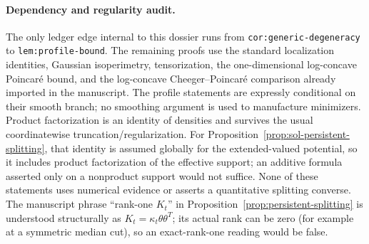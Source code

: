 \documentclass[../main.tex]{subfiles}
\begin{document}
\paragraph{Dependency and regularity audit.}
The only ledger edge internal to this dossier runs from
\texttt{cor:generic-degeneracy} to \texttt{lem:profile-bound}.  The remaining proofs use the
standard localization identities, Gaussian isoperimetry, tensorization, the one-dimensional
log-concave Poincar\'e bound, and the log-concave Cheeger--Poincar\'e comparison already imported
in the manuscript.  The profile statements are expressly conditional on their smooth branch;
no smoothing argument is used to manufacture minimizers.  Product factorization is an identity
of densities and survives the usual coordinatewise truncation/regularization.  For
Proposition~\ref{prop:sol-persistent-splitting}, that identity is assumed globally for the
extended-valued potential, so it includes product factorization of the effective support; an
additive formula asserted only on a nonproduct support would not suffice.  None of these
statements uses numerical evidence or asserts a quantitative splitting converse.
The manuscript phrase ``rank-one $K_t$'' in Proposition~\ref{prop:persistent-splitting} is
understood structurally as $K_t=\kappa_t\theta\theta^T$; its actual rank can be zero (for example
at a symmetric median cut), so an exact-rank-one reading would be false.
\end{document}
